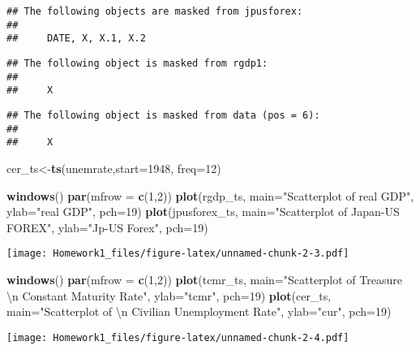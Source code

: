 \documentclass[]{article}
\newenvironment{Shaded}{\begin{snugshade}}{\end{snugshade}}
\newcommand{\KeywordTok}[1]{\textcolor[rgb]{0.13,0.29,0.53}{\textbf{#1}}}
\newcommand{\DataTypeTok}[1]{\textcolor[rgb]{0.13,0.29,0.53}{#1}}
\newcommand{\DecValTok}[1]{\textcolor[rgb]{0.00,0.00,0.81}{#1}}
\newcommand{\CharTok}[1]{\textcolor[rgb]{0.31,0.60,0.02}{#1}}
\newcommand{\StringTok}[1]{\textcolor[rgb]{0.31,0.60,0.02}{#1}}
\newcommand{\NormalTok}[1]{#1}
\begin{document}
\begin{verbatim}
## The following objects are masked from jpusforex:
## 
##     DATE, X, X.1, X.2
\end{verbatim}

\begin{verbatim}
## The following object is masked from rgdp1:
## 
##     X
\end{verbatim}

\begin{verbatim}
## The following object is masked from data (pos = 6):
## 
##     X
\end{verbatim}

\begin{Shaded}
\begin{Highlighting}[]
\NormalTok{cer_ts<-}\KeywordTok{ts}\NormalTok{(unemrate,}\DataTypeTok{start=}\DecValTok{1948}\NormalTok{, }\DataTypeTok{freq=}\DecValTok{12}\NormalTok{)}

\KeywordTok{windows}\NormalTok{()}
\KeywordTok{par}\NormalTok{(}\DataTypeTok{mfrow =} \KeywordTok{c}\NormalTok{(}\DecValTok{1}\NormalTok{,}\DecValTok{2}\NormalTok{))}
\KeywordTok{plot}\NormalTok{(rgdp_ts, }\DataTypeTok{main=}\StringTok{"Scatterplot of real GDP"}\NormalTok{,  }
     \DataTypeTok{ylab=}\StringTok{"real GDP"}\NormalTok{, }\DataTypeTok{pch=}\DecValTok{19}\NormalTok{)}
\KeywordTok{plot}\NormalTok{(jpusforex_ts, }\DataTypeTok{main=}\StringTok{"Scatterplot of Japan-US FOREX"}\NormalTok{,  }
     \DataTypeTok{ylab=}\StringTok{"Jp-US Forex"}\NormalTok{, }\DataTypeTok{pch=}\DecValTok{19}\NormalTok{)}
\end{Highlighting}
\end{Shaded}

\texttt{[image: Homework1\_files/figure-latex/unnamed-chunk-2-3.pdf]}

\begin{Shaded}
\begin{Highlighting}[]
\KeywordTok{windows}\NormalTok{()}
\KeywordTok{par}\NormalTok{(}\DataTypeTok{mfrow =} \KeywordTok{c}\NormalTok{(}\DecValTok{1}\NormalTok{,}\DecValTok{2}\NormalTok{))}
\KeywordTok{plot}\NormalTok{(tcmr_ts, }\DataTypeTok{main=}\StringTok{"Scatterplot of Treasure }\CharTok{\textbackslash{}n}\StringTok{ Constant Maturity Rate"}\NormalTok{,  }
     \DataTypeTok{ylab=}\StringTok{"tcmr"}\NormalTok{, }\DataTypeTok{pch=}\DecValTok{19}\NormalTok{)}
\KeywordTok{plot}\NormalTok{(cer_ts, }\DataTypeTok{main=}\StringTok{"Scatterplot of }\CharTok{\textbackslash{}n}\StringTok{ Civilian Unemployment Rate"}\NormalTok{,  }
     \DataTypeTok{ylab=}\StringTok{"cur"}\NormalTok{, }\DataTypeTok{pch=}\DecValTok{19}\NormalTok{)}
\end{Highlighting}
\end{Shaded}

\texttt{[image: Homework1\_files/figure-latex/unnamed-chunk-2-4.pdf]}
\end{document}
